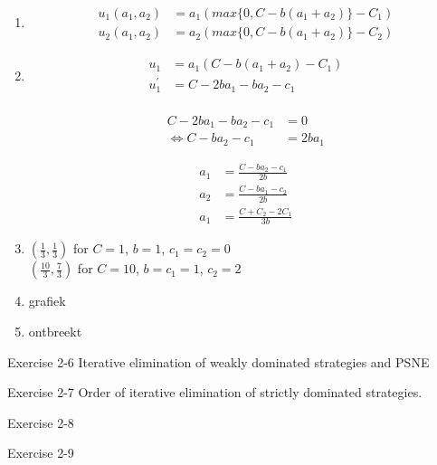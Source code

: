 \documentclass[../main.tex]{subfiles}
\begin{document}
\begin{solution}
	\begin{enumerate}
	\item
		\begin{align}
		u_1(a_1,a_2)& = a_1(max\{0,C-b(a_1+a_2)\} - C_1)\\
		u_2(a_1,a_2)& = a_2(max\{0,C-b(a_1+a_2)\} - C_2)
		\end{align}
		
		
	\item 
		\begin{align}
		u_1& = a_1(C-b(a_1+a_2) - C_1)\\
		u_1^{'}& = C - 2ba_1 - ba_2 - c_1\\
		\end{align}
		
		\begin{align}
		C - 2ba_1 - ba_2 - c_1& = 0\\
		\Leftrightarrow C-ba_2-c_1& = 2ba_1
		\end{align}
		
		\begin{align}
		a_1& = \frac{C-ba_2 - c_1}{2b}\\
		a_2& = \frac{C - ba_1 - c_2}{2b}\\
		a_1& = \frac{C+C_2 - 2C_1}{3b}
		\end{align}
		
	\item
		$(\frac{1}{3},\frac{1}{3})$ for $C = 1$, $b = 1$, $c_1 = c_2 = 0$\\
		$(\frac{10}{3},\frac{7}{3})$ for $C = 10$, $b = c_1 = 1$, $c_2 = 2$
	
	\item grafiek %
	\item ontbreekt %
	\end{enumerate}
\end{solution}

\begin{question}
Exercise 2-6 Iterative elimination of weakly dominated strategies and PSNE
\end{question}

\begin{solution}
\end{solution}

\begin{question}
Exercise 2-7 Order of iterative elimination of strictly dominated strategies.
\end{question}

\begin{solution}
\end{solution}

\begin{question}
Exercise 2-8
\end{question}

\begin{solution}
\end{solution}

\begin{question}
Exercise 2-9
\end{question}

\begin{solution}
\end{solution}
\end{document}
